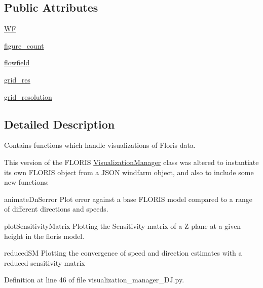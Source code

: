 \subsection*{Public Attributes}
\begin{DoxyCompactItemize}
\item 
\mbox{\hyperlink{classvisualization__manager___d_j_1_1_visualization_manager_a56add1b450c7ecd758b096117f593578}{WF}}
\item 
\mbox{\hyperlink{classvisualization__manager___d_j_1_1_visualization_manager_add58b653067c1364e389b5a9ea1e4f5b}{figure\+\_\+count}}
\item 
\mbox{\hyperlink{classvisualization__manager___d_j_1_1_visualization_manager_aadb6e88d03aa67b6045f66dcad66799c}{flowfield}}
\item 
\mbox{\hyperlink{classvisualization__manager___d_j_1_1_visualization_manager_ad34898259a1773b5e43ab50eae783e1d}{grid\+\_\+res}}
\item 
\mbox{\hyperlink{classvisualization__manager___d_j_1_1_visualization_manager_ad5b8013f5cdf47f6384ae56186810e2b}{grid\+\_\+resolution}}
\end{DoxyCompactItemize}


\subsection{Detailed Description}
Contains functions which handle visualizations of Floris data. 

This version of the F\+L\+O\+R\+IS \mbox{\hyperlink{classvisualization__manager___d_j_1_1_visualization_manager}{Visualization\+Manager}} class was altered to instantiate its own F\+L\+O\+R\+IS object from a J\+S\+ON windfarm object, and also to include some new functions\+:


\begin{DoxyEnumerate}
\item animate\+Dn\+Serror Plot error against a base F\+L\+O\+R\+IS model compared to a range of different directions and speeds.
\item plot\+Sensitivity\+Matrix Plotting the Sensitivity matrix of a Z plane at a given height in the floris model.
\item reduced\+SM Plotting the convergence of speed and direction estimates with a reduced sensitivity matrix 
\end{DoxyEnumerate}

Definition at line 46 of file visualization\+\_\+manager\+\_\+\+D\+J.\+py.



